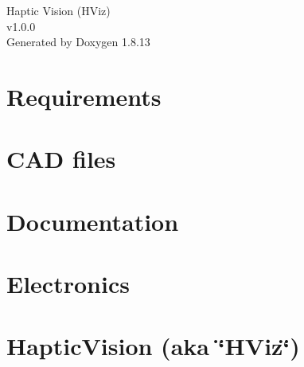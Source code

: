 \documentclass[twoside]{book}
\newcommand{\+}{\discretionary{\mbox{\scriptsize$\hookleftarrow$}}{}{}}
\newcommand{\clearemptydoublepage}{%
  \newpage{\pagestyle{empty}\cleardoublepage}%
}
\begin{document}
\hypersetup{pageanchor=false,
             bookmarksnumbered=true,
             pdfencoding=unicode
            }
\begin{titlepage}
\vspace*{7cm}
\begin{center}%
{\Large Haptic Vision (H\+Viz) \\[1ex]\large v1.\+0.\+0 }\\
\vspace*{1cm}
{\large Generated by Doxygen 1.8.13}\\
\end{center}
\end{titlepage}
\clearemptydoublepage
{}
\tableofcontents
\clearemptydoublepage
{}
\hypersetup{pageanchor=true}

\chapter{Requirements}
\label{index}\hypertarget{index}{}
\chapter{C\+AD files}
\label{md__home_joseph_hviz_joel_ss_extras_CAD_files_README}

\chapter{Documentation}
\label{md__home_joseph_hviz_joel_ss_extras_Documentation_README}

\chapter{Electronics}
\label{md__home_joseph_hviz_joel_ss_extras_Electronics_README}

\chapter{Haptic\+Vision (aka \char`\"{}\+H\+Viz\char`\"{})}
\label{md__home_joseph_hviz_joel_ss_extras_General_README}

\end{document}
